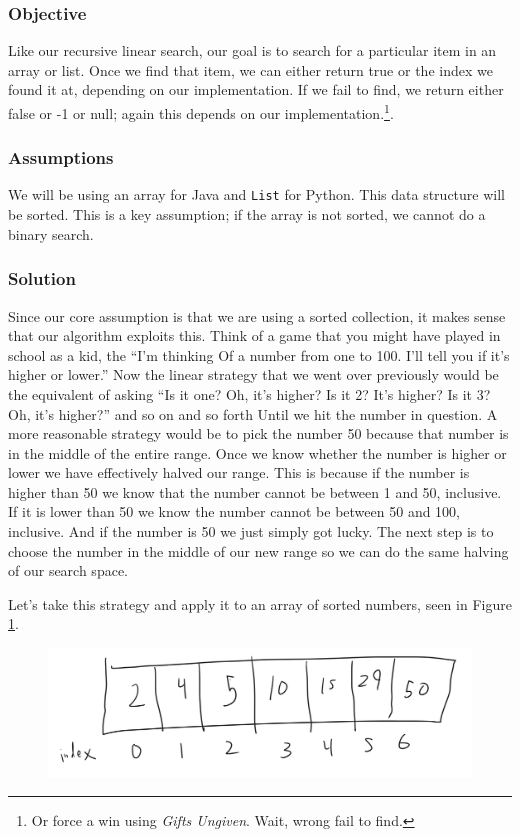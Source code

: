 \subsubsection{Objective}
Like our recursive linear search, our goal is to search for a particular item in an array or list.  Once we find that item, we can either return true or the index we found it at, depending on our implementation.  If we fail to find, we return either false or -1 or null; again this depends on our implementation.\footnote{Or force a win using \textit{Gifts Ungiven}.  Wait, wrong fail to find.}.

\subsubsection{Assumptions}
We will be using an array for Java and \texttt{List} for Python.  This data structure will be sorted.  This is a key assumption;  if the array is not sorted, we cannot do a binary search.

\subsubsection{Solution}
Since our core assumption is that we are using a sorted collection, it makes sense that our algorithm exploits this.  Think of a game that you might have played in school as a kid, the ``I'm thinking Of a number from one to 100. I'll tell you if it's higher or lower.''  Now the linear strategy that we went over previously would be the equivalent of asking ``Is it one? Oh, it's higher? Is it 2? It's higher? Is it 3? Oh, it's higher?'' and so on and so forth Until we hit the number in question. A more reasonable strategy would be to pick the number 50 because that number is in the middle of the entire range.  Once we know whether the number is higher or lower we have effectively halved our range. This is because if the number is higher than 50 we know that the number cannot be between 1 and 50, inclusive. If it is lower than 50 we know the number cannot be between 50 and 100, inclusive.   And if the number is 50 we just simply got lucky.
The next step is to choose the number in the middle of our new range so we can do the same halving of our search space.

Let's take this strategy and apply it to an array of sorted numbers, seen in Figure \ref{fig:binarysearch1}.

 
\begin{figure}[h!]
	\centering
	\includegraphics[width=0.7\linewidth]{pics/binarySearch1}
	\caption{}
	\label{fig:binarysearch1}
\end{figure}


